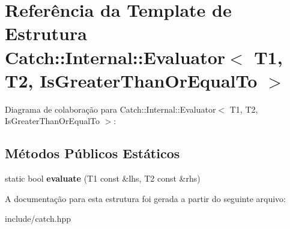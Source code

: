 \hypertarget{structCatch_1_1Internal_1_1Evaluator_3_01T1_00_01T2_00_01IsGreaterThanOrEqualTo_01_4}{}\section{Referência da Template de Estrutura Catch\+:\+:Internal\+:\+:Evaluator$<$ T1, T2, Is\+Greater\+Than\+Or\+Equal\+To $>$}
\label{structCatch_1_1Internal_1_1Evaluator_3_01T1_00_01T2_00_01IsGreaterThanOrEqualTo_01_4}


Diagrama de colaboração para Catch\+:\+:Internal\+:\+:Evaluator$<$ T1, T2, Is\+Greater\+Than\+Or\+Equal\+To $>$\+:
\subsection*{Métodos Públicos Estáticos}
\begin{DoxyCompactItemize}
\item 
static bool {\bfseries evaluate} (T1 const \&lhs, T2 const \&rhs)\hypertarget{structCatch_1_1Internal_1_1Evaluator_3_01T1_00_01T2_00_01IsGreaterThanOrEqualTo_01_4_a5ba107c6da4292b6492a0e5e906f9484}{}\label{structCatch_1_1Internal_1_1Evaluator_3_01T1_00_01T2_00_01IsGreaterThanOrEqualTo_01_4_a5ba107c6da4292b6492a0e5e906f9484}

\end{DoxyCompactItemize}


A documentação para esta estrutura foi gerada a partir do seguinte arquivo\+:\begin{DoxyCompactItemize}
\item 
include/catch.\+hpp\end{DoxyCompactItemize}
